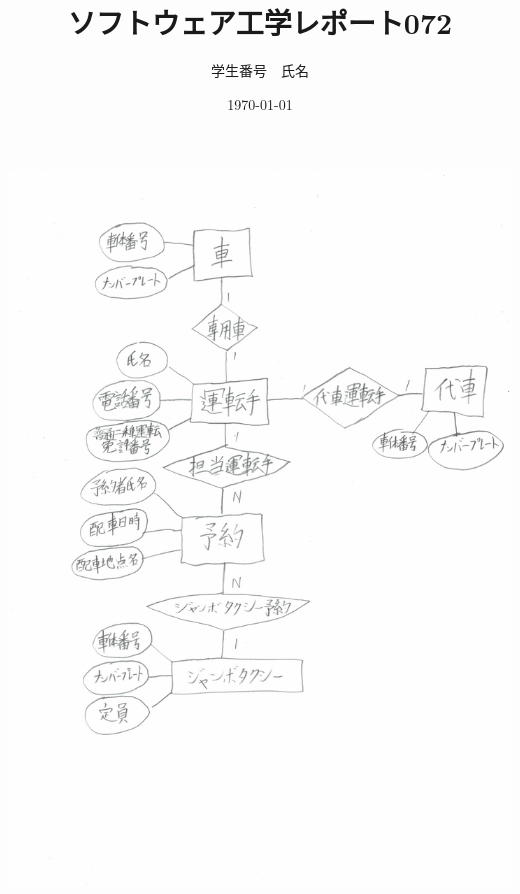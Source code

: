\documentclass[a4paper]{jarticle}
\title{ソフトウェア工学レポート072}
\author{学生番号　氏名}
\date{\today}
\begin{document}
\maketitle

\includegraphics[width=15cm]{PeterChen.JPG}
\end{document}
